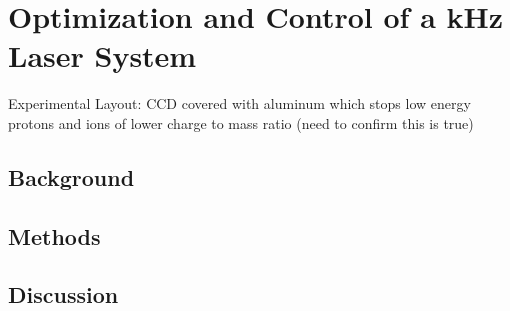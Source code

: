 \chapter{Optimization and Control of a kHz Laser System} \label{ch:6}

Experimental Layout: \gls{CCD} covered with aluminum which stops low energy protons and ions of lower charge to mass ratio (need to confirm this is true)

\section{Background}

\section{Methods}

\section{Discussion}